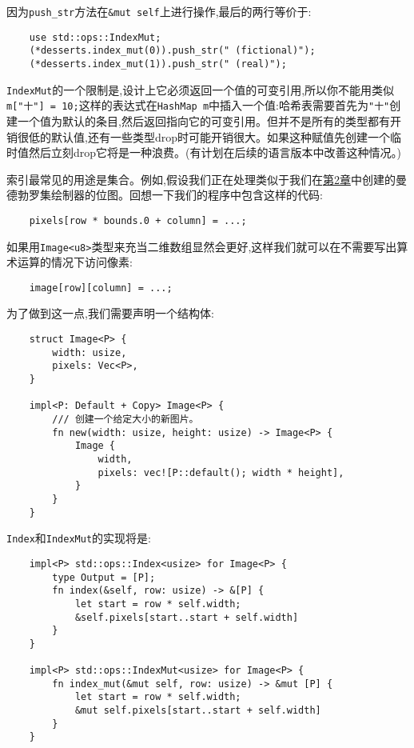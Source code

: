 因为\texttt{push\_str}方法在\texttt{\&mut self}上进行操作,最后的两行等价于:
\begin{verbatim}
    use std::ops::IndexMut;
    (*desserts.index_mut(0)).push_str(" (fictional)");
    (*desserts.index_mut(1)).push_str(" (real)");
\end{verbatim}

\texttt{IndexMut}的一个限制是,设计上它必须返回一个值的可变引用,所以你不能用类似\texttt{m["十"] = 10;}这样的表达式在\texttt{HashMap m}中插入一个值:哈希表需要首先为\texttt{"十"}创建一个值为默认的条目,然后返回指向它的可变引用。但并不是所有的类型都有开销很低的默认值,还有一些类型drop时可能开销很大。如果这种赋值先创建一个临时值然后立刻drop它将是一种浪费。(有计划在后续的语言版本中改善这种情况。)

索引最常见的用途是集合。例如,假设我们正在处理类似于我们在\hyperref[ch02]{第2章}中创建的曼德勃罗集绘制器的位图。回想一下我们的程序中包含这样的代码:
\begin{verbatim}
    pixels[row * bounds.0 + column] = ...;
\end{verbatim}

如果用\texttt{Image<u8>}类型来充当二维数组显然会更好,这样我们就可以在不需要写出算术运算的情况下访问像素:
\begin{verbatim}
    image[row][column] = ...;
\end{verbatim}

为了做到这一点,我们需要声明一个结构体:
\begin{verbatim}
    struct Image<P> {
        width: usize,
        pixels: Vec<P>,
    }

    impl<P: Default + Copy> Image<P> {
        /// 创建一个给定大小的新图片。
        fn new(width: usize, height: usize) -> Image<P> {
            Image {
                width,
                pixels: vec![P::default(); width * height],
            }
        }
    }
\end{verbatim}

\texttt{Index}和\texttt{IndexMut}的实现将是:
\begin{verbatim}
    impl<P> std::ops::Index<usize> for Image<P> {
        type Output = [P];
        fn index(&self, row: usize) -> &[P] {
            let start = row * self.width;
            &self.pixels[start..start + self.width]
        }
    }

    impl<P> std::ops::IndexMut<usize> for Image<P> {
        fn index_mut(&mut self, row: usize) -> &mut [P] {
            let start = row * self.width;
            &mut self.pixels[start..start + self.width]
        }
    }
\end{verbatim}

